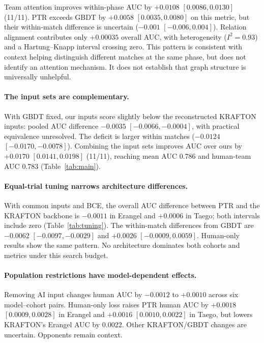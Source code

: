 \documentclass[sigconf,anonymous,nonacm]{acmart}
\begin{document}
Team attention improves within-phase AUC by $+0.0108$ $[0.0086,\allowbreak 0.0130]$ (11/11). PTR exceeds GBDT by $+0.0058$ $[0.0035,\allowbreak 0.0080]$ on this metric, but their within-match difference is uncertain ($-0.001$ $[-0.006,\allowbreak 0.004]$). Relation alignment contributes only $+0.00035$ overall AUC, with heterogeneity ($I^2=0.93$) and a Hartung--Knapp interval crossing zero. This pattern is consistent with context helping distinguish different matches at the same phase, but does not identify an attention mechanism. It does not establish that graph structure is universally unhelpful.

\paragraph{The input sets are complementary.}
With GBDT fixed, our inputs score slightly below the reconstructed KRAFTON inputs: pooled AUC difference $-0.0035$ $[-0.0066,\allowbreak -0.0004]$, with practical equivalence unresolved. The deficit is larger within matches ($-0.0124$ $[-0.0170,\allowbreak -0.0078]$). Combining the input sets improves AUC over ours by $+0.0170$ $[0.0141,\allowbreak 0.0198]$ (11/11), reaching mean AUC 0.786 and human-team AUC 0.783 (Table~\ref{tab:main}).

\paragraph{Equal-trial tuning narrows architecture differences.}
With common inputs and BCE, the overall AUC difference between PTR and the KRAFTON backbone is $-0.0011$ in Erangel and $+0.0006$ in Taego; both intervals include zero (Table~\ref{tab:tuning}). The within-match differences from GBDT are $-0.0062$ $[-0.0097,\allowbreak -0.0029]$ and $+0.0026$ $[-0.0009,\allowbreak 0.0059]$. Human-only results show the same pattern. No architecture dominates both cohorts and metrics under this search budget.


\paragraph{Population restrictions have model-dependent effects.}
Removing AI input changes human AUC by $-0.0012$ to $+0.0010$ across six model--cohort pairs. Human-only loss raises PTR human AUC by $+0.0018$ $[0.0009,\allowbreak 0.0028]$ in Erangel and $+0.0016$ $[0.0010,\allowbreak 0.0022]$ in Taego, but lowers KRAFTON's Erangel AUC by 0.0022. Other KRAFTON/GBDT changes are uncertain. Opponents remain context.
\end{document}
